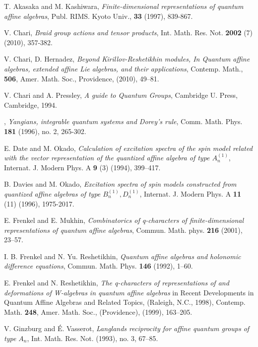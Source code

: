 \documentclass[11pt, leqno]{amsart}
\theoremstyle{definition}
\numberwithin{equation}{section}
\begin{document}
\begin{thebibliography}{99}
\nocite{}

 T. Akasaka and M. Kashiwara,
{\it Finite-dimensional representations of quantum affine algebras},
Publ. RIMS. Kyoto Univ., {\bf33} (1997), 839-867.

 V. Chari,
{\it Braid group actions and tensor products}, Int. Math. Res. Not.
{\bf2002} (7) (2010), 357-382.

 V. Chari, D. Hernadez, {\it Beyond Kirillov-Reshetikhin modules, In Quantum affine algebras, extended
affine Lie algebras, and their applications}, Contemp. Math., {\bf 506}, Amer. Math. Soc., Providence, (2010), 49--81.

 V. Chari and A. Pressley,
{\em A guide to Quantum Groups}, Cambridge U. Press, Cambridge, 1994.

 \bysame, {\it Yangians, integrable quantum systems and Dorey's rule}, Comm. Math. Phys. {\bf 181} (1996),
no. 2, 265-302.

E. Date and M. Okado, {\it Calculation of excitation spectra of the spin model related with the vector
representation of the quantized affine algebra of type $A^{(1)}_n$}, Internat. J. Modern Phys. A {\bf 9} (3) (1994), 399--417.

B. Davies  and  M. Okado, {\it Excitation spectra of spin models
constructed from quantized affine algebras of type $B_n^{(1)},
D_n^{(1)}$}, Internat. J. Modern Phys. A {\bf 11} (11) (1996),
1975-2017.

E. Frenkel and E. Mukhin, {\it Combinatorics of q-characters of finite-dimensional representations
of quantum affine algebras}, Commun. Math. phys. {\bf 216} (2001), 23--57.

I. B. Frenkel  and  N. Yu. Reshetikhin,
{\it Quantum affine algebras and holonomic difference equations},
Commun. Math. Phys.  {\bf146} (1992), 1--60.

E. Frenkel and N. Reshetikhin, {\it The q-characters of representations of and
deformations of W-algebras in quantum affine algebras} in Recent
Developments in Quantum Affine Algebras and Related Topics, (Raleigh, N.C.,
1998), Contemp. Math. {\bf 248}, Amer. Math. Soc., (Providence), (1999), 163--205.

V. Ginzburg and \'{E}. Vasserot, {\it Langlands reciprocity for affine quantum groups
of type $A_n$}, Int. Math. Res. Not. (1993), no. 3, 67--85.


\end{thebibliography}
\end{document}
